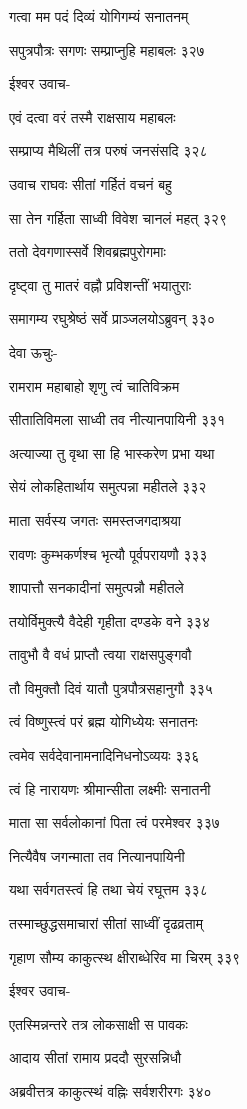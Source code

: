 गत्वा मम पदं दिव्यं योगिगम्यं सनातनम्

सपुत्रपौत्रः सगणः सम्प्राप्नुहि महाबलः ३२७

ईश्वर उवाच-

एवं दत्वा वरं तस्मै राक्षसाय महाबलः

सम्प्राप्य मैथिलीं तत्र परुषं जनसंसदि ३२८

उवाच राघवः सीतां गर्हितं वचनं बहु

सा तेन गर्हिता साध्वी विवेश चानलं महत् ३२९

ततो देवगणास्सर्वे शिवब्रह्मपुरोगमाः

दृष्ट्वा तु मातरं वह्नौ प्रविशन्तीं भयातुराः

समागम्य रघुश्रेष्ठं सर्वे प्राञ्जलयोऽब्रुवन् ३३०

देवा ऊचुः-

रामराम महाबाहो शृणु त्वं चातिविक्रम

सीतातिविमला साध्वी तव नीत्यानपायिनी ३३१

अत्याज्या तु वृथा सा हि भास्करेण प्रभा यथा

सेयं लोकहितार्थाय समुत्पन्ना महीतले ३३२

माता सर्वस्य जगतः समस्तजगदाश्रया

रावणः कुम्भकर्णश्च भृत्यौ पूर्वपरायणौ ३३३

शापात्तौ सनकादीनां समुत्पन्नौ महीतले

तयोर्विमुक्त्यै वैदेही गृहीता दण्डके वने ३३४

तावुभौ वै वधं प्राप्तौ त्वया राक्षसपुङ्गवौ

तौ विमुक्तौ दिवं यातौ पुत्रपौत्रसहानुगौ ३३५

त्वं विष्णुस्त्वं परं ब्रह्म योगिध्येयः सनातनः

त्वमेव सर्वदेवानामनादिनिधनोऽव्ययः ३३६

त्वं हि नारायणः श्रीमान्सीता लक्ष्मीः सनातनी

माता सा सर्वलोकानां पिता त्वं परमेश्वर ३३७

नित्यैवैष जगन्माता तव नित्यानपायिनी

यथा सर्वगतस्त्वं हि तथा चेयं रघूत्तम ३३८

तस्माच्छुद्धसमाचारां सीतां साध्वीं दृढव्रताम्

गृहाण सौम्य काकुत्स्थ क्षीराब्धेरिव मा चिरम् ३३९

ईश्वर उवाच-

एतस्मिन्नन्तरे तत्र लोकसाक्षी स पावकः

आदाय सीतां रामाय प्रददौ सुरसन्निधौ

अब्रवीत्तत्र काकुत्स्थं वह्निः सर्वशरीरगः ३४०

